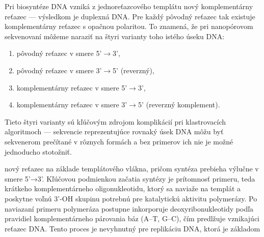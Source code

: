 Pri biosyntéze DNA vzniká z jednoreťazcového templátu nový komplementárny reťazec --- výsledkom je duplexná DNA. Pre každý pôvodný reťazec tak existuje komplementárny reťazec s opačnou polaritou. To znamená, že pri nanopórovom sekvenovaní môžeme naraziť na štyri varianty toho istého úseku DNA:
\begin{enumerate}
    \item pôvodný reťazec v smere 5'$\rightarrow$3',
    \item pôvodný reťazec v smere 3'$\rightarrow$5' (reverzný),
    \item komplementárny reťazec v smere 5'$\rightarrow$3',
    \item komplementárny reťazec v smere 3'$\rightarrow$5' (reverzný komplement).
\end{enumerate}

Tieto štyri varianty sú kľúčovým zdrojom komplikácií pri klastrovacích algoritmoch --- sekvencie reprezentujúce rovnaký úsek DNA môžu byť sekvenerom prečítané v rôznych formách a bez primerov ich nie je možné jednoducho stotožniť.

nový reťazec na základe templátového vlákna, pričom syntéza
prebieha výlučne v smere 5’→3’. Kľúčovou podmienkou začatia 
syntézy je prítomnosť primeru, teda krátkeho komplementárneho
oligonukleotidu, ktorý sa naviaže na templát a poskytne voľnú
3’-OH skupinu potrebnú pre katalytickú aktivitu polymerázy. 
Po naviazaní primeru polymeráza postupne inkorporuje deoxyribonukleotidy 
podľa pravidiel komplementárneho párovania báz (A–T, G–C), čím predlžuje 
vznikajúci reťazec
DNA. Tento proces je nevyhnutný pre replikáciu DNA, ktorá je základom